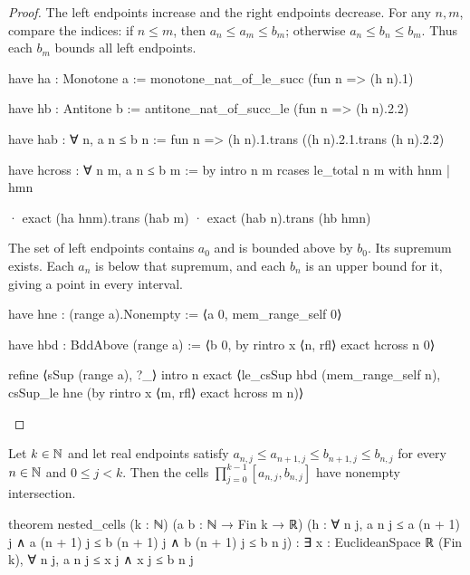 \begin{proof}
  The left endpoints increase and the right endpoints decrease.
  For any $n,m$, compare the indices: if $n\leq m$, then $a_n\leq a_m\leq b_m$; otherwise $a_n\leq
    b_n\leq b_m$.
  Thus each $b_m$ bounds all left endpoints.

  \begin{lean}
    have ha : Monotone a := monotone_nat_of_le_succ (fun n => (h n).1)

    have hb : Antitone b := antitone_nat_of_succ_le (fun n => (h n).2.2)

    have hab : ∀ n, a n ≤ b n := fun n => (h n).1.trans ((h n).2.1.trans (h n).2.2)

    have hcross : ∀ n m, a n ≤ b m := by
      intro n m
      rcases le_total n m with hnm | hmn

      · exact (ha hnm).trans (hab m)
      · exact (hab n).trans (hb hmn)
  \end{lean}

  The set of left endpoints contains $a_0$ and is bounded above by $b_0$.
  Its supremum exists.
  Each $a_n$ is below that supremum, and each $b_n$ is an upper bound for it, giving a point in
  every interval.

  \begin{lean}
    have hne : (range a).Nonempty := ⟨a 0, mem_range_self 0⟩

    have hbd : BddAbove (range a) := ⟨b 0, by
      rintro x ⟨n, rfl⟩
      exact hcross n 0⟩

    refine ⟨sSup (range a), ?_⟩
    intro n
    exact ⟨le_csSup hbd (mem_range_self n), csSup_le hne (by
      rintro x ⟨m, rfl⟩
      exact hcross m n)⟩
  \end{lean}

\end{proof}

\begin{theorem}
  \label{an1:thm:nested-k-cells}
  Let $k\in\mathbb{N}$ and let real endpoints satisfy $a_{n,j}\leq a_{n+1,j}\leq b_{n+1,j}\leq b_{n,j}$
  for every $n\in\mathbb{N}$ and $0\leq j<k$.
  Then the cells $\prod_{j=0}^{k-1}[a_{n,j},b_{n,j}]$ have nonempty intersection.

  \begin{lean}
    theorem nested_cells (k : ℕ) (a b : ℕ → Fin k → ℝ)
        (h : ∀ n j, a n j ≤ a (n + 1) j ∧
          a (n + 1) j ≤ b (n + 1) j ∧ b (n + 1) j ≤ b n j) :
        ∃ x : EuclideanSpace ℝ (Fin k), ∀ n j, a n j ≤ x j ∧ x j ≤ b n j
  \end{lean}
\end{theorem}

